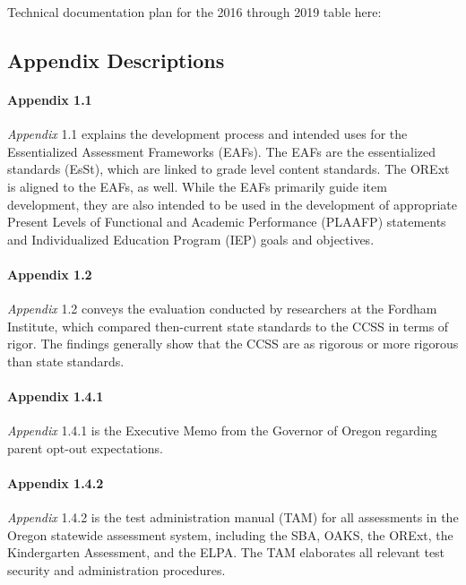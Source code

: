 \documentclass[]{article}
\let\oldparagraph\paragraph
\renewcommand{\paragraph}[1]{\oldparagraph{#1}\mbox{}}
\begin{document}
Technical documentation plan for the 2016 through 2019 table here:

\subsection{Appendix Descriptions}\label{appendix-descriptions}

\paragraph{Appendix 1.1}\label{appendix-1.1}

\emph{Appendix} 1.1 explains the development process and intended uses
for the Essentialized Assessment Frameworks (EAFs). The EAFs are the
essentialized standards (EsSt), which are linked to grade level content
standards. The ORExt is aligned to the EAFs, as well. While the EAFs
primarily guide item development, they are also intended to be used in
the development of appropriate Present Levels of Functional and Academic
Performance (PLAAFP) statements and Individualized Education Program
(IEP) goals and objectives.

\paragraph{Appendix 1.2}\label{appendix-1.2}

\emph{Appendix} 1.2 conveys the evaluation conducted by researchers at
the Fordham Institute, which compared then-current state standards to
the CCSS in terms of rigor. The findings generally show that the CCSS
are as rigorous or more rigorous than state standards.

\paragraph{Appendix 1.4.1}\label{appendix-1.4.1}

\emph{Appendix} 1.4.1 is the Executive Memo from the Governor of Oregon
regarding parent opt-out expectations.

\paragraph{Appendix 1.4.2}\label{appendix-1.4.2}

\emph{Appendix} 1.4.2 is the test administration manual (TAM) for all
assessments in the Oregon statewide assessment system, including the
SBA, OAKS, the ORExt, the Kindergarten Assessment, and the ELPA. The TAM
elaborates all relevant test security and administration procedures.
\end{document}
